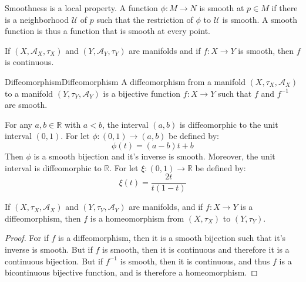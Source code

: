 \documentclass[oneside]{book}                                                  %
\begin{document}
                Smoothness is a local property. A function $\phi:M\rightarrow{N}$
                is smooth at $p\in{M}$ if there is a neighborhood
                $\mathcal{U}$ of $p$ such that the restriction of $\phi$ to
                $\mathcal{U}$ is smooth. A smooth function is thus a function
                that is smooth at every point.
                \begin{theorem}
                    If $(X,\mathcal{A}_{X},\tau_{X})$ and
                    $(Y,\mathcal{A}_{Y},\tau_{Y})$ are manifolds and if
                    $f:X\rightarrow{Y}$ is smooth, then $f$ is continuous.
                \end{theorem}
                \begin{fdefinition}{Diffeomorphism}{Diffeomorphism}
                    A diffeomorphism from a manifold $(X,\tau_{X},\mathcal{A}_{X})$
                    to a manifold $(Y,\tau_{Y},\mathcal{A}_{Y})$ is a bijective
                    function $f:X\rightarrow{Y}$ such that $f$ and $f^{\minus{1}}$
                    are smooth.
                \end{fdefinition}
                \begin{example}
                    For any $a,b\in\mathbb{R}$ with $a<b$, the interval
                    $(a,b)$ is diffeomorphic to the unit interval $(0,1)$. For
                    let $\phi:(0,1)\rightarrow(a,b)$ be defined by:
                    \begin{equation}
                        \phi(t)=(a-b)t+b
                    \end{equation}
                    Then $\phi$ is a smooth bijection and it's inverse is smooth.
                    Moreover, the unit interval is diffeomorphic to $\mathbb{R}$.
                    For let $\xi:(0,1)\rightarrow\mathbb{R}$ be defined by:
                    \begin{equation}
                        \xi(t)=\frac{2t}{t(1-t)}
                    \end{equation}
                \end{example}
                \begin{theorem}
                    If $(X,\tau_{X},\mathcal{A}_{X})$ and
                    $(Y,\tau_{Y},\mathcal{A}_{Y})$ are manifolds, and if
                    $f:X\rightarrow{Y}$ is a diffeomorphism, then $f$ is a
                    homeomorphism from $(X,\tau_{X})$ to $(Y,\tau_{Y})$.
                \end{theorem}
                \begin{proof}
                    For if $f$ is a diffeomorphism, then it is a smooth bijection
                    such that it's inverse is smooth. But if $f$ is smooth, then
                    it is continuous and therefore it is a continuous bijection.
                    But if $f^{\minus{1}}$ is smooth, then it is continuous, and
                    thus $f$ is a bicontinuous bijective function, and is therefore
                    a homeomorphism.
                \end{proof}
\end{document}
